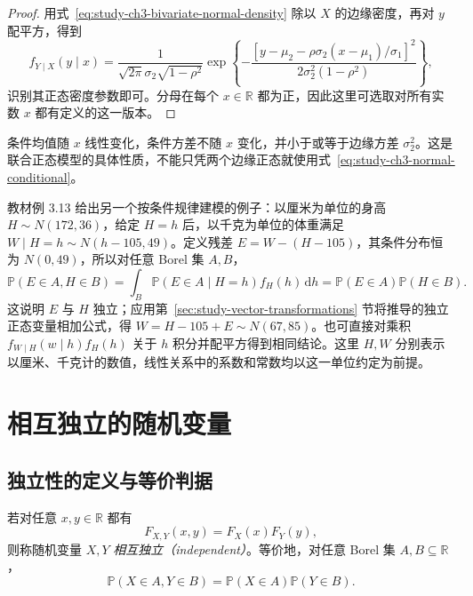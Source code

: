 \begin{proof}
用式~\eqref{eq:study-ch3-bivariate-normal-density} 除以 $X$ 的边缘密度，再对 $y$ 配平方，得到
\[
  f_{Y\mid X}(y\mid x)
  =\frac1{\sqrt{2\pi}\sigma_2\sqrt{1-\rho^2}}
  \exp\!\left\{-\frac{
    [y-\mu_2-\rho\sigma_2(x-\mu_1)/\sigma_1]^2}
    {2\sigma_2^2(1-\rho^2)}\right\},
\]
识别其正态密度参数即可。分母在每个 $x\in\mathbb R$ 都为正，因此这里可选取对所有实数 $x$ 都有定义的这一版本。
\end{proof}

条件均值随 $x$ 线性变化，条件方差不随 $x$ 变化，并小于或等于边缘方差 $\sigma_2^2$。这是联合正态模型的具体性质，不能只凭两个边缘正态就使用式~\eqref{eq:study-ch3-normal-conditional}。

教材例 3.13 给出另一个按条件规律建模的例子：以厘米为单位的身高 $H\sim N(172,36)$，给定 $H=h$ 后，以千克为单位的体重满足 $W\mid H=h\sim N(h-105,49)$。定义残差 $E=W-(H-105)$，其条件分布恒为 $N(0,49)$，所以对任意 Borel 集 $A,B$，
\[
  \mathbb P(E\in A,H\in B)
  =\int_B\mathbb P(E\in A\mid H=h)f_H(h)\,\mathrm dh
  =\mathbb P(E\in A)\mathbb P(H\in B).
\]
这说明 $E$ 与 $H$ 独立；应用第~\ref{sec:study-vector-transformations} 节将推导的独立正态变量相加公式，得 $W=H-105+E\sim N(67,85)$。也可直接对乘积 $f_{W\mid H}(w\mid h)f_H(h)$ 关于 $h$ 积分并配平方得到相同结论。这里 $H,W$ 分别表示以厘米、千克计的数值，线性关系中的系数和常数均以这一单位约定为前提。

\section{相互独立的随机变量}
\label{sec:study-independent-variables}

\subsection{独立性的定义与等价判据}

\begin{definition}
\label{def:study-ch3-independent-variables}
若对任意 $x,y\in\mathbb R$ 都有
\begin{equation}
  F_{X,Y}(x,y)=F_X(x)F_Y(y),
  \label{eq:study-ch3-independence-cdf}
\end{equation}
则称随机变量 $X,Y$ \emph{相互独立（independent）}。等价地，对任意 Borel 集 $A,B\subseteq\mathbb R$，
\begin{equation}
  \mathbb P(X\in A,Y\in B)=\mathbb P(X\in A)\mathbb P(Y\in B).
  \label{eq:study-ch3-independence-borel}
\end{equation}
\end{definition}

